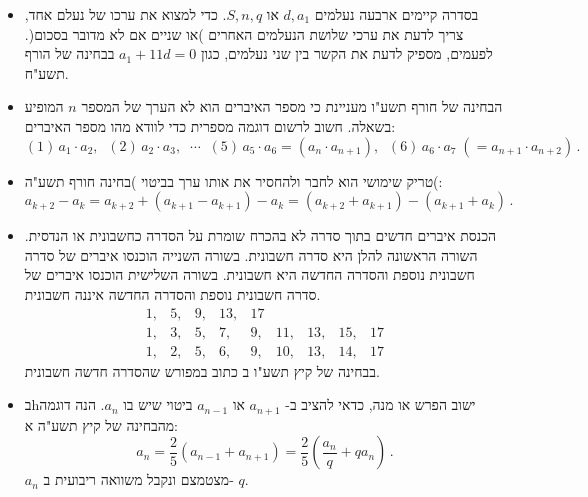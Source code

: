 \begin{itemize}
\item
בסדרה קיימים ארבעה נעלמים
$d, a_1$
או
$S, n, q$.
כדי למצוא את ערכו של נעלם אחד, צריך לדעת את ערכי שלושת הנעלמים האחרים )או שניים אם לא מדובר בסכום(. לפעמים, מספיק לדעת את הקשר בין שני נעלמים, כגון
$a_1+11d = 0$
בבחינה של הורף תשע"ח.

\np

\item
הבחינה של חורף תשע"ו מעניינת כי מספר האיברים הוא לא הערך של המספר 
$n$
המופיע בשאלה. חשוב לרשום דוגמה מספרית כדי לוודא מהו מספר האיברים:
\[
(1)\, a_1\cdot a_2,\;\; (2)\,a_2\cdot a_3,\;\;\cdots\;\; (5)\,a_5\cdot a_6=(a_n\cdot a_{n+1}),\;\; (6)\,a_6\cdot a_7 \;(= a_{n+1}\cdot a_{n+2})\,.
\]
\vspace{-4ex}

\item
טריק שימושי הוא לחבר ולהחסיר את אותו ערך בביטוי )בחינה  חורף תשע"ה(:
\[
a_{k+2} - a_{k} = a_{k+2}+(a_{k+1}-a_{k+1})-a_{k} = (a_{k+2}+a_{k+1})-(a_{k+1}+a_{k})\,.
\]
\vspace{-4ex}

\item
הכנסת איברים חדשים בתוך סדרה לא בהכרח שומרת על הסדרה כחשבונית או הנדסית. השורה הראשונה להלן היא סדרה חשבונית. בשורה השנייה הוכנסו איברים של סדרה חשבונית נוספת והסדרה החדשה היא חשבונית. בשורה השלישית הוכנסו איברים של סדרה חשבונית נוספת והסדרה החדשה איננה חשבונית.
\[
\begin{array}{rrrrrrrrrrrrr}
1,& 5,& 9,& 13,& 17\\
1, &3,& 5,&7,& 9,& 11,& 13, &15, & 17\\
1, &2,& 5,&6,& 9,& 10,& 13, &14, & 17
\end{array}
\]
בבחינה של קיץ תשע"ו ב כתוב במפורש שהסדרה חדשה חשבונית.

\item
בhישוב הפרש או מנה, כדאי להציב ב-%
$a_{n+1}$
או
$a_{n-1}$
ביטוי שיש בו 
$a_n$.
הנה דוגמה מהבחינה של  קיץ תשע"ה א:
\[
a_n = \frac{2}{5}(a_{n-1}+a_{n+1}) =\frac{2}{5}\left(\frac{a_n}{q}+qa_n\right)\,.
\]
$a_n$
מצטמצם ונקבל משוואה ריבועית ב-%
$q$.

\end{itemize}

